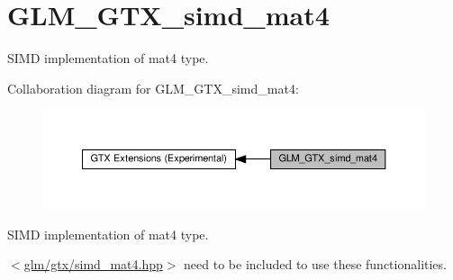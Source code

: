 \hypertarget{group__gtx__simd__mat4}{}\section{G\+L\+M\+\_\+\+G\+T\+X\+\_\+simd\+\_\+mat4}
\label{group__gtx__simd__mat4}


S\+I\+MD implementation of mat4 type.  


Collaboration diagram for G\+L\+M\+\_\+\+G\+T\+X\+\_\+simd\+\_\+mat4\+:\nopagebreak
\begin{figure}[H]
\begin{center}
\leavevmode
\includegraphics[width=350pt]{group__gtx__simd__mat4}
\end{center}
\end{figure}
S\+I\+MD implementation of mat4 type. 

$<$\hyperlink{simd__mat4_8hpp}{glm/gtx/simd\+\_\+mat4.\+hpp}$>$ need to be included to use these functionalities. 
